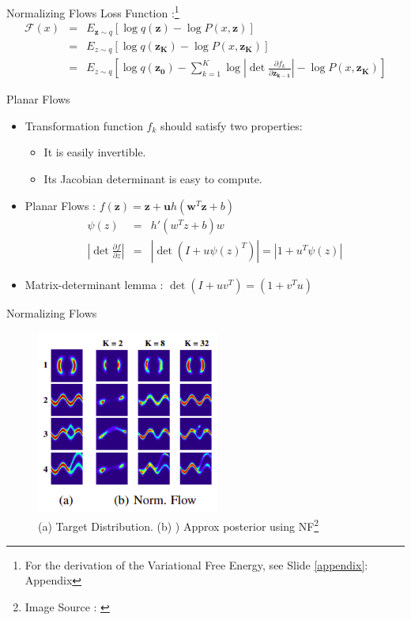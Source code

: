 \documentclass{beamer}
\begin{document}
\begin{frame}{Normalizing Flows}
Loss Function :\footnote{For the derivation of the Variational Free Energy, see Slide \ref{appendix}: Appendix}
\begin{eqnarray}
\mathcal{F}(x) &=& E_{\mathbf{z} \sim q}[\log q(\mathbf{z}) - \log P(x, \mathbf{z})] \\
&=&  E_{z \sim q}[\log q(\mathbf{z_K}) - \log P(x, \mathbf{z_K})] \\
&=&  E_{z \sim q}[\log q(\mathbf{z_0}) - \sum_{k=1}^{K} \log \left| \det \frac{\partial{f_k}}{\partial{\mathbf{z_{k-1}}}} \right| - \log P(x, \mathbf{z_K})] \label{vfeflow}
\end{eqnarray}
\end{frame}
\begin{frame}{Planar Flows}
   \begin{itemize}
       \item Transformation function $f_k$ should satisfy two properties:
       \begin{itemize}
           \item It is easily invertible.
           \item Its Jacobian determinant is easy to compute.
       \end{itemize}
       \item Planar Flows : $f(\mathbf{z}) = \mathbf{z} + \mathbf{u} h(\mathbf{w}^T \mathbf{z} + b)$ 
   \begin{eqnarray}
    \psi(z) &=& h'(w^Tz + b)w \\
    \left| \det \frac{\partial{f}}{\partial{z}} \right| &=& \left| \det(I + u \psi (z)^T)  \right| = \left| 1+u^T \psi (z)  \right|
    \end{eqnarray}
    \item Matrix-determinant lemma : $\det(I + uv^T) = (1 + v^Tu)$
    \end{itemize}
\end{frame}
\begin{frame}{Normalizing Flows}
    \begin{figure}
        \centering
        \includegraphics[width=60mm,scale=0.65]{nf-result.png}
        \caption{(a) Target Distribution. (b) ) Approx posterior using NF\footnote{Image Source : \cite{rezende2015variational}}}
        \label{fig:my_label}
    \end{figure}
\end{frame}
\end{document}
